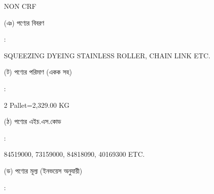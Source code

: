 \documentclass[12pt]{article}
\newcommand{\good}{SQUEEZING DYEING STAINLESS ROLLER, CHAIN LINK ETC.}
\newcommand{\pkg}{2 Pallet=2,329.00 KG}
\newcommand{\hscode}{84519000, 73159000, 84818090, 40169300 ETC.}
\newcommand{\crf}{NON CRF}
\newcommand{\crfdt}{}
\begin{document}
\begin{minipage}[t]{0.53\linewidth}
{\crf} \hspace{2em} {\crfdt}
\\
\end{minipage}
\begin{minipage}[t]{0.05\linewidth}
\hspace*{1em}
\end{minipage}
\begin{minipage}[t]{0.40\linewidth}
(ঞ) পণ্যের বিবরণ
\end{minipage}
\begin{minipage}[t]{0.02\linewidth}
:
\end{minipage}
\begin{minipage}[t]{0.53\linewidth}
{\good}
\\
\end{minipage}
\begin{minipage}[t]{0.05\linewidth}
\hspace*{1em}
\end{minipage}
\begin{minipage}[t]{0.40\linewidth}
(ট) পণ্যের পরিমাণ (একক সহ)
\end{minipage}
\begin{minipage}[t]{0.02\linewidth}
:
\end{minipage}
\begin{minipage}[t]{0.53\linewidth}
{\pkg}
\\
\end{minipage}
\begin{minipage}[t]{0.05\linewidth}
\hspace*{1em}
\end{minipage}
\begin{minipage}[t]{0.40\linewidth}
(ঠ) পণ্যের এইচ.এস.কোড
\end{minipage}
\begin{minipage}[t]{0.02\linewidth}
:
\end{minipage}
\begin{minipage}[t]{0.53\linewidth}
{\hscode}
\\
\end{minipage}
\begin{minipage}[t]{0.05\linewidth}
\hspace*{1em}
\end{minipage}
\begin{minipage}[t]{0.40\linewidth}
(ড) পণ্যের মূল্য (ইনভয়েস অনুযায়ী)
\end{minipage}
\begin{minipage}[t]{0.02\linewidth}
:
\end{minipage}
\end{document}
